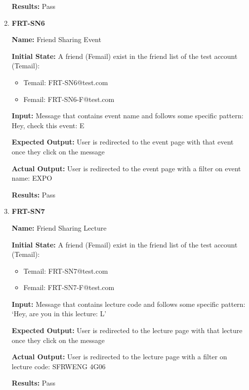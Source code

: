 \documentclass[12pt, titlepage]{article}
\begin{document}
\begin{enumerate}
\textbf{Results:} Pass

\item \textbf{FRT-SN6}

\textbf{Name:} Friend Sharing Event

\textbf{Initial State:} A friend (Femail) exist in the friend list of the test account (Temail):
\begin{itemize}
\item Temail: FRT-SN6@test.com
\item Femail: FRT-SN6-F@test.com
\end{itemize}

\textbf{Input:} Message that contains event name and follows some specific pattern:
Hey, check this event: \textunderscore E\textunderscore[EXPO]
					
\textbf{Expected Output:} User is redirected to the event page with that event once they click on the message

\textbf{Actual Output:} User is redirected to the event page with a filter on event name: EXPO

\textbf{Results:} Pass

\item \textbf{FRT-SN7}

\textbf{Name:} Friend Sharing Lecture

\textbf{Initial State:} A friend (Femail) exist in the friend list of the test account (Temail):
\begin{itemize}
\item Temail: FRT-SN7@test.com
\item Femail: FRT-SN7-F@test.com
\end{itemize}

\textbf{Input:} Message that contains lecture code and follows some specific pattern:
`Hey, are you in this lecture: \textunderscore L\textunderscore[SFRWENG 4G06]'
					
\textbf{Expected Output:} User is redirected to the lecture page with that lecture once they click on the message

\textbf{Actual Output:} User is redirected to the lecture page with a filter on lecture code: SFRWENG 4G06

\textbf{Results:} Pass
\end{enumerate}
\end{document}
